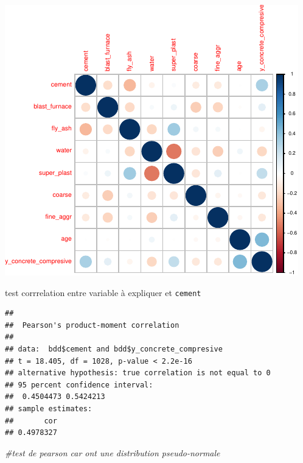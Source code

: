 \documentclass[
  12pt,
]{article}
\newenvironment{Shaded}{\begin{snugshade}}{\end{snugshade}}
\newcommand{\AttributeTok}[1]{\textcolor[rgb]{0.13,0.29,0.53}{#1}}
\newcommand{\CommentTok}[1]{\textcolor[rgb]{0.56,0.35,0.01}{\textit{#1}}}
\newcommand{\FunctionTok}[1]{\textcolor[rgb]{0.13,0.29,0.53}{\textbf{#1}}}
\newcommand{\NormalTok}[1]{#1}
\newcommand{\SpecialCharTok}[1]{\textcolor[rgb]{0.81,0.36,0.00}{\textbf{#1}}}
\newcommand{\StringTok}[1]{\textcolor[rgb]{0.31,0.60,0.02}{#1}}
\begin{document}
\begin{center}\includegraphics{rmd_final_files/figure-latex/corr_y-1} \end{center}

test corrrelation entre variable à expliquer et \texttt{cement}

\begin{Shaded}
\end{Shaded}

\begin{verbatim}
## 
##  Pearson's product-moment correlation
## 
## data:  bdd$cement and bdd$y_concrete_compresive
## t = 18.405, df = 1028, p-value < 2.2e-16
## alternative hypothesis: true correlation is not equal to 0
## 95 percent confidence interval:
##  0.4504473 0.5424213
## sample estimates:
##       cor 
## 0.4978327
\end{verbatim}

\begin{Shaded}
\begin{Highlighting}[]
\CommentTok{\#test de pearson car ont une distribution pseudo{-}normale}
\end{Highlighting}
\end{Shaded}
\end{document}
